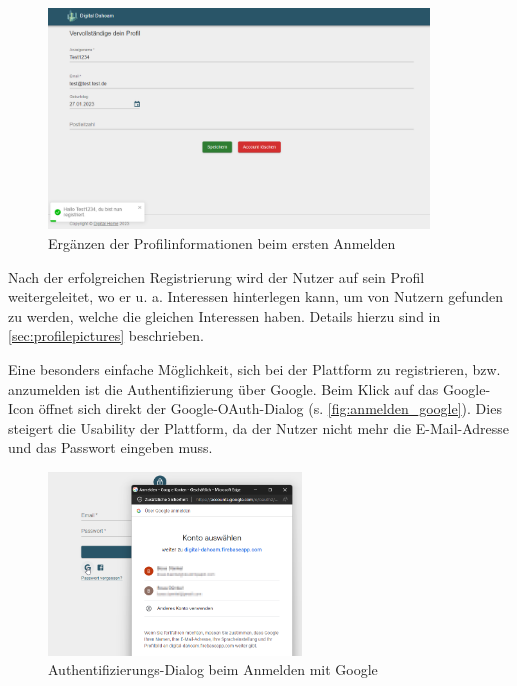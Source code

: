 \begin{figure}[htb]
  \centering
  \includegraphics[width=0.9\textwidth]{figures/boas/21_registrieren_profilinfo.png}
  \caption[]{Ergänzen der Profilinformationen beim ersten Anmelden}
  \label{fig:registrieren_profilinfo}
\end{figure}

Nach der erfolgreichen Registrierung wird der Nutzer auf sein Profil weitergeleitet, wo er u. a. Interessen hinterlegen kann, um von Nutzern gefunden zu werden, welche die gleichen Interessen haben. Details hierzu sind in \autoref{sec:profilepictures} beschrieben.

Eine besonders einfache Möglichkeit, sich bei der Plattform zu registrieren, bzw. anzumelden ist die Authentifizierung über Google. Beim Klick auf das Google-Icon öffnet sich direkt der Google-OAuth-Dialog (s. \autoref{fig:anmelden_google}). Dies steigert die Usability der Plattform, da der Nutzer nicht mehr die E-Mail-Adresse und das Passwort eingeben muss.

\begin{figure}[htb]
  \centering
  \includegraphics[width=0.6\textwidth]{figures/boas/21_anmelden_google.png}
  \caption[]{Authentifizierungs-Dialog beim Anmelden mit Google}
  \label{fig:anmelden_google}
\end{figure}

